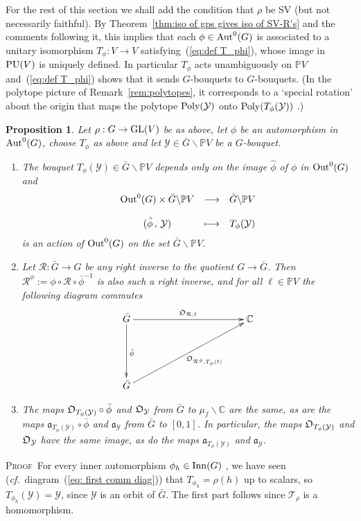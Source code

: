 \documentclass[12pt]{article}
\newtheorem{prop}{Proposition}[section]
\newcommand{\Aut}{{\rm Aut}}
\newcommand{\PVmodbarG}{\ensuremath{
\bar{G}\backslash \bbP V}}
\newcommand{\bbC}{\ensuremath{\mathbb{C}}}\newcommand{\bbCp}{\ensuremath{\mathbb{C}_p}}
\newcommand{\bbP}{\ensuremath{\mathbb{P}}}
\newcommand{\bPf}{\noindent \textsc{Proof\ }}
\newcommand{\cf}{\emph{cf.}}
\newcommand{\cR}{\ensuremath{\mathcal{R}}}
\newcommand{\cT}{\ensuremath{\mathcal{T}}}
\newcommand{\cY}{\ensuremath{\mathcal{Y}}}
\newcommand{\displaynomapdef}[4]
{
	\begin{array}{ccc}
		#1 &\longrightarrow& #2 \\
		&                    \\
		#3 &\longmapsto    & #4
	\end{array}
}
\newcommand{\fa}{\ensuremath{\mathfrak{a}}}
\newcommand{\GL}{{\rm GL}}
\newcommand{\Inn}{{\rm Inn}}
\newcommand{\inv}{^{-1}}%
\newcommand{\Out}{{\rm Out}}
\newcommand{\barG}{\ensuremath{\bar{G}}}
\newcommand{\cAng}{{\frak O}}
\begin{document}
For the rest of this section we shall add the condition that $\rho$ be SV (but not necessarily faithful). By Theorem~\ref{thm:iso of gps gives iso of SV-R's} and the comments following it, this implies that each $\phi\in\Aut^{0}(G)$ is associated to a unitary isomorphism $T_\phi:V\rightarrow V$ satisfying~(\ref{eq:def T_phi}), whose image in ${\rm PU}(V)$ is uniquely defined. In particular  $T_\phi$ acts unambiguously on $\bbP V$   and~(\ref{eq:def T_phi}) 
shows that it sends $G$-bouquets to $G$-bouquets. (In the polytope picture of Remark~\ref{rem:polytopes}, it corresponds to a `special rotation' about the origin that maps the polytope ${\rm Poly}(\cY)$ onto ${\rm Poly}(T_\phi(\cY))$ .)
\begin{prop}\label{prop:Upper Triangle Commutes}
Let $\rho:G\rightarrow\GL(V)$ be as above, let $\phi$ be an automorphism in $\Aut^0(G)$, choose $T_\phi$ as above and let $\cY\in\PVmodbarG$ be a $G$-bouquet.
\begin{enumerate}
\item\label{part:Upper Triangle Commutes 1} The bouquet $T_\phi(\cY)\in\PVmodbarG$ \emph{depends only on the image  $\hat{\phi}$ of $\phi$ in $\Out^0(G)$} and 
$$
\displaynomapdef{\Out^{0}(G)\times\PVmodbarG}{\PVmodbarG}{(\hat{\phi}\, ,\, \cY)}{T_\phi(\cY)}
$$ 
is an action of $\Out^0(G)$ on the set $\PVmodbarG$.
\item Let $\cR:\barG\rightarrow G$ be any right inverse to the quotient $G\rightarrow \barG$. 
Then $\cR^\phi:=\phi\circ\cR\circ\bar{\phi}\inv$ 
is also such a right inverse, and for all $\ell\in\bbP V$ the following diagram commutes
\begin{equation}\label{diag:Upper Triangle Commutes}
{\xymatrix{
	\bar{G}\ar[dd]^{\bar{\phi}}\ar[rrrr]^{\cAng_{\cR,\ell}}&&&&\bbC\\
	&&&&\\
	\bar{G}
	\ar[rrrruu]_{\ \ \cAng_{\cR^\phi, T_\phi(\ell)}}&&&&
}}
\end{equation}
\item\label{part:Upper Triangle Commutes 3} The maps $\cAng_{T_\phi(\cY)}\circ\bar{\phi}$ and $\cAng_{\cY}$ from $\bar{G}$ to $\mu_f\backslash\bbC$ are the same, as are the maps  $\fa_{T_\phi(\cY)}\circ\bar{\phi}$ and $\fa_{\cY}$ from $\bar{G}$ to $[0,1]$. In particular, the maps $\cAng_{T_\phi(\cY)}$ and $\cAng_{\cY}$ have the same image, as do the maps $\fa_{T_\phi(\cY)}$ and $\fa_{\cY}$. 
\end{enumerate}
\end{prop}
\bPf For every inner automorphism $\phi_h\in\Inn(G)$ , we have seen (\cf\ diagram~(\ref{eq: first comm diag})) that $T_{\phi_h}=\rho(h)$ up to scalars, so $T_{\phi_h}(\cY)=\cY$, since $\cY$ is an orbit of $\bar{G}$. The first part follows since $\cT_\rho$ is a homomorphism.
\end{document}

